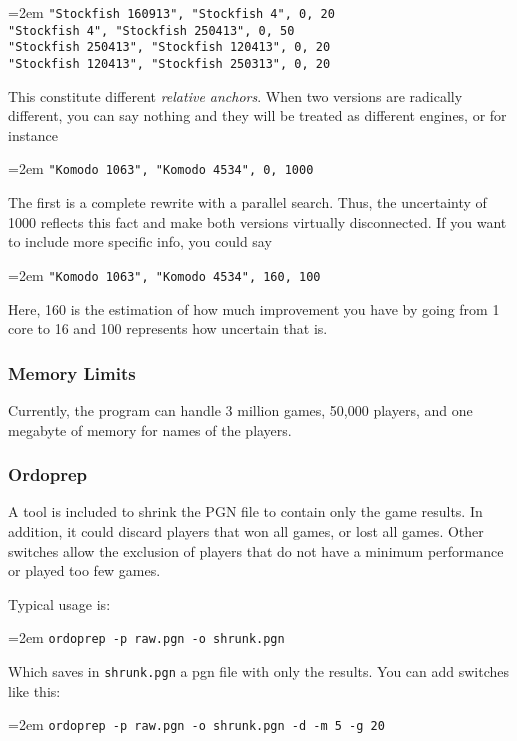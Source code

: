 \documentclass[12pt]{article}
\newcommand{\filename} [1] {\texttt{#1}}
\newcommand{\cmdln}[1]{
	\par
	\begingroup
		\leftskip=2em
		\addtolength{\rightskip}{0em}
		\noindent \small{\texttt{#1}}
		\par
	\endgroup
}
\begin{document}
\cmdln{"Stockfish 160913", "Stockfish 4",        0, 20\\
"Stockfish 4",      "Stockfish 250413",   0, 50\\
"Stockfish 250413", "Stockfish 120413",   0, 20\\
"Stockfish 120413", "Stockfish 250313",   0, 20}

This constitute different \textit{relative anchors}.
When two versions are radically different, you can say nothing and they will be treated as different engines, or for instance

\cmdln{"Komodo 1063",      "Komodo 4534",        0, 1000}

The first is a complete rewrite with a parallel search. Thus, the uncertainty of 1000 reflects this fact and make both versions virtually disconnected. 
If you want to include more specific info, you could say

\cmdln{"Komodo 1063",      "Komodo 4534",        160, 100}

Here, 160 is the estimation of how much improvement you have by going from 1 core to 16 and 100 represents how uncertain that is. 












\subsubsection*{Memory Limits}
Currently, the program can handle 3 million games, 50,000 players, and one megabyte of memory for names of the players.

\subsubsection*{Ordoprep}
A tool is included to shrink the PGN file to contain only the game results. 
In addition, it could discard players that won all games, or lost all games. 
Other switches allow the exclusion of players that do not have a minimum performance or played too few games.

Typical usage is:

\cmdln{ordoprep -p raw.pgn -o shrunk.pgn}

Which saves in \filename{shrunk.pgn} a pgn file with only the results. 
You can add switches like this:

\cmdln{ordoprep -p raw.pgn -o shrunk.pgn -d -m 5 -g 20}
\end{document}
